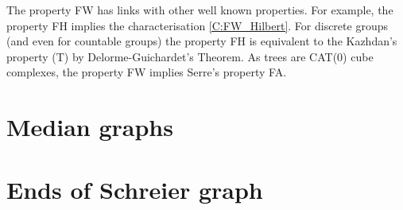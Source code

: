 \documentclass[a4paper]{article}
\theoremstyle{definition}
\theoremstyle{remark}%
\begin{document}
The property FW has links with other well known properties. For example, the property FH implies the characterisation \ref{C:FW_Hilbert}. For discrete groups (and even for countable groups) the property FH is equivalent to the Kazhdan's property (T) by Delorme-Guichardet's Theorem. As trees are CAT(0) cube complexes, the property FW implies Serre's property FA. %
%
%
\section{Median graphs}

\section{Ends of Schreier graph}














\enddocument
\end{document}
